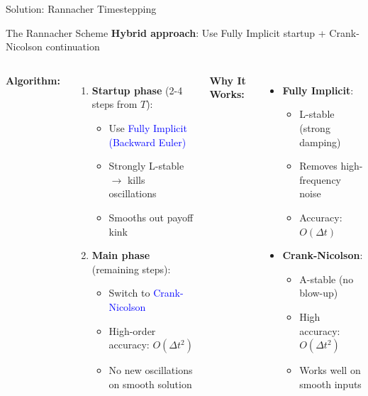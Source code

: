 \documentclass[aspectratio=169]{beamer}
\begin{document}
\begin{frame}{Solution: Rannacher Timestepping}

\begin{block}{The Rannacher Scheme}
\textbf{Hybrid approach}: Use Fully Implicit startup + Crank-Nicolson continuation
\end{block}

\vspace{0.5em}
\begin{columns}
\textbf{Algorithm:}
\begin{enumerate}
    \item \textbf{Startup phase} (2-4 steps from $T$):
    \begin{itemize}
        \item Use \textcolor{blue}{Fully Implicit (Backward Euler)}
        \item Strongly L-stable $\rightarrow$ kills oscillations
        \item Smooths out payoff kink
    \end{itemize}

    \vspace{0.3em}
    \item \textbf{Main phase} (remaining steps):
    \begin{itemize}
        \item Switch to \textcolor{blue}{Crank-Nicolson}
        \item High-order accuracy: $O(\Delta t^2)$
        \item No new oscillations on smooth solution
    \end{itemize}
\end{enumerate}

\textbf{Why It Works:}

\begin{itemize}
    \item \textbf{Fully Implicit}:
    \begin{itemize}
        \item L-stable (strong damping)
        \item Removes high-frequency noise
        \item Accuracy: $O(\Delta t)$
    \end{itemize}

    \vspace{0.3em}
    \item \textbf{Crank-Nicolson}:
    \begin{itemize}
        \item A-stable (no blow-up)
        \item High accuracy: $O(\Delta t^2)$
        \item Works well on smooth inputs
    \end{itemize}
\end{itemize}


\end{columns}
\end{frame}
\end{document}
